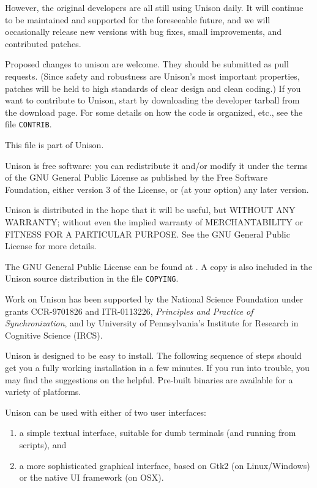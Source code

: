 \documentclass{article}
\begin{document}
However, the original developers are all still using Unison daily.  It
will continue to be maintained and supported for the foreseeable future,
and we will occasionally release new versions with bug fixes, small
improvements, and contributed patches.

Proposed changes to unison are welcome.
They should be submitted as pull requests.
(Since safety and robustness are Unison's most important properties,
patches will be held to high standards of clear design and clean coding.)
If you want to contribute to Unison, start by downloading the developer
tarball from the download page.  For some details on how the code is
organized, etc., see the file {\tt CONTRIB}.


This file is part of Unison.

    Unison is free software: you can redistribute it and/or modify
    it under the terms of the GNU General Public License as published by
    the Free Software Foundation, either version 3 of the License, or
    (at your option) any later version.

    Unison is distributed in the hope that it will be useful,
    but WITHOUT ANY WARRANTY; without even the implied warranty of
    MERCHANTABILITY or FITNESS FOR A PARTICULAR PURPOSE.  See the
    GNU General Public License for more details.

    The GNU General Public License can be found at
    .  A copy is also included in the
    Unison source distribution in the file {\tt COPYING}.


Work on Unison has been supported by the National Science Foundation
under grants CCR-9701826 and ITR-0113226, {\em Principles and Practice of
  Synchronization}, and by University of Pennsylvania's Institute for
Research in Cognitive Science (IRCS).


Unison is designed to be easy to install.  The following sequence of
steps should get you a fully working installation in a few minutes.  If
you run into trouble, you may find the suggestions on the
 helpful.  Pre-built binaries are available for a
variety of platforms.

Unison can be used with either of two user interfaces:
\begin{enumerate}
\item a simple textual interface, suitable for dumb terminals (and
running from scripts), and
\item a more sophisticated graphical interface, based on Gtk2 (on
       Linux/Windows) or the native UI framework (on OSX).
\end{enumerate}
\end{document}

